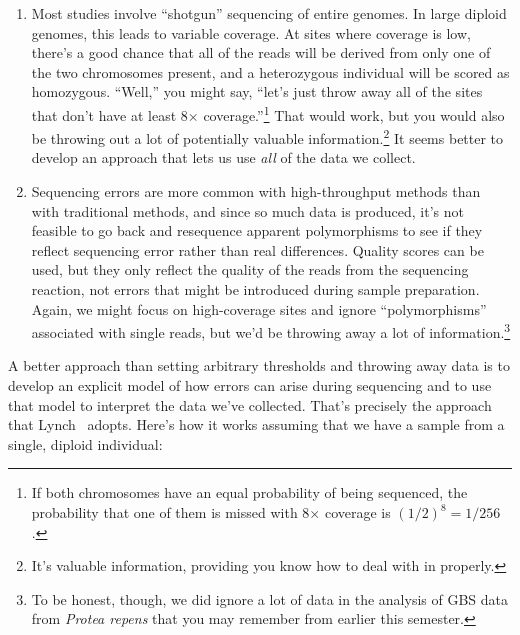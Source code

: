 \begin{enumerate}

\item Most studies involve ``shotgun'' sequencing of entire
  genomes. In large diploid genomes, this leads to variable
  coverage. At sites where coverage is low, there's a good chance that
  all of the reads will be derived from only one of the two
  chromosomes present, and a heterozygous individual will be scored as
  homozygous. ``Well,'' you might say, ``let's just throw away all of
  the sites that don't have at least 8$\times$ coverage.''\footnote{If
    both chromosomes have an equal probability of being sequenced, the
    probability that one of them is missed with 8$\times$ coverage is
    $(1/2)^8 = 1/256$.} That would work, but you would also be
  throwing out a lot of potentially valuable information.\footnote{It's
    valuable information, providing you know how to deal with in
    properly.} It seems better to develop an approach that lets us use
  {\it all\/} of the data we collect.

\item Sequencing errors are more common with high-throughput methods
  than with traditional methods, and since so much data is produced,
  it's not feasible to go back and resequence apparent polymorphisms
  to see if they reflect sequencing error rather than real
  differences. Quality scores can be used, but they only reflect the
  quality of the reads from the sequencing reaction, not errors that
  might be introduced during sample preparation. Again, we might focus
  on high-coverage sites and ignore ``polymorphisms'' associated with
  single reads, but we'd be throwing away a lot of
  information.\footnote{To be honest, though, we did ignore a lot of
    data in the analysis of GBS data from {\it Protea repens\/} that
    you may remember from earlier this semester.} 

\end{enumerate}
A better approach than setting arbitrary thresholds and throwing away
data is to develop an explicit model of how errors can arise during
sequencing and to use that model to interpret the data we've
collected. That's precisely the approach that Lynch~\cite{Lynch-2008}
adopts. Here's how it works assuming that we have a sample from a
single, diploid individual:


